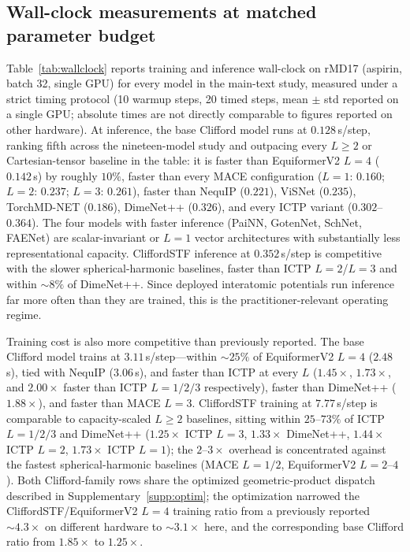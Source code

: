 \subsection{Wall-clock measurements at matched parameter budget}\label{supp:wallclock}

Table~\ref{tab:wallclock} reports training and inference wall-clock on rMD17 (aspirin, batch 32, single GPU) for every model in the main-text study, measured under a strict timing protocol (10 warmup steps, 20 timed steps, mean $\pm$ std reported on a single GPU; absolute times are not directly comparable to figures reported on other hardware). At inference, the base Clifford model runs at $0.128$\,s/step, ranking fifth across the nineteen-model study and outpacing every $L\!\geq\!2$ or Cartesian-tensor baseline in the table: it is faster than EquiformerV2 $L{=}4$ ($0.142$\,s) by roughly $10\%$, faster than every MACE configuration ($L{=}1$: $0.160$; $L{=}2$: $0.237$; $L{=}3$: $0.261$), faster than NequIP ($0.221$), ViSNet ($0.235$), TorchMD-NET ($0.186$), DimeNet++ ($0.326$), and every ICTP variant ($0.302$--$0.364$). The four models with faster inference (PaiNN, GotenNet, SchNet, FAENet) are scalar-invariant or $L{=}1$ vector architectures with substantially less representational capacity. CliffordSTF inference at $0.352$\,s/step is competitive with the slower spherical-harmonic baselines, faster than ICTP $L{=}2$/$L{=}3$ and within $\sim\!8\%$ of DimeNet++. Since deployed interatomic potentials run inference far more often than they are trained, this is the practitioner-relevant operating regime.

Training cost is also more competitive than previously reported. The base Clifford model trains at $3.11$\,s/step---within $\sim\!25\%$ of EquiformerV2 $L{=}4$ ($2.48$\,s), tied with NequIP ($3.06$\,s), and faster than ICTP at every $L$ ($1.45\times$, $1.73\times$, and $2.00\times$ faster than ICTP $L{=}1/2/3$ respectively), faster than DimeNet++ ($1.88\times$), and faster than MACE $L{=}3$. CliffordSTF training at $7.77$\,s/step is comparable to capacity-scaled $L\!\geq\!2$ baselines, sitting within $25$--$73\%$ of ICTP $L{=}1/2/3$ and DimeNet++ ($1.25\times$ ICTP $L{=}3$, $1.33\times$ DimeNet++, $1.44\times$ ICTP $L{=}2$, $1.73\times$ ICTP $L{=}1$); the $2$--$3\times$ overhead is concentrated against the fastest spherical-harmonic baselines (MACE $L{=}1/2$, EquiformerV2 $L{=}2$--$4$). Both Clifford-family rows share the optimized geometric-product dispatch described in Supplementary~\ref{supp:optim}; the optimization narrowed the CliffordSTF/EquiformerV2 $L{=}4$ training ratio from a previously reported $\sim\!4.3\times$ on different hardware to $\sim\!3.1\times$ here, and the corresponding base Clifford ratio from $1.85\times$ to $1.25\times$.

